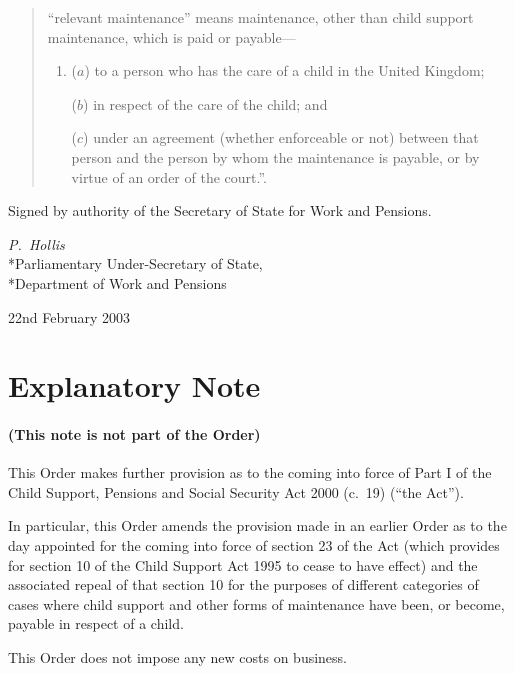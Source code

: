 \documentclass[12pt,a4paper]{article}
\begin{document}
\begin{quotation}
\begin{enumerate}
“relevant maintenance” means maintenance, other than child support maintenance, which is paid or payable—
\begin{enumerate}\item[]
($a$) 
to a person who has the care of a child in the United Kingdom;

($b$) 
in respect of the care of the child; and

($c$) 
under an agreement (whether enforceable or not) between that person and the person by whom the maintenance is payable, or by virtue of an order of the court.”.
\end{enumerate}
\end{enumerate}
\end{quotation}

\bigskip

Signed 
by authority of the Secretary of State for Work and Pensions.

{\raggedleft
\emph{P.~Hollis}\\*Parliamentary Under-Secretary of State,\\*Department of Work and Pensions

}


22nd February 2003

\small

\part{Explanatory Note}

\renewcommand\parthead{— Explanatory Note}

\subsection*{(This note is not part of the Order)}

This Order makes further provision as to the coming into force of Part I of the Child Support, Pensions and Social Security Act 2000 (c.\ 19) (“the Act”).

In particular, this Order amends the provision made in an earlier Order as to the day appointed for the coming into force of section 23 of the Act (which provides for section 10 of the Child Support Act 1995 to cease to have effect) and the associated repeal of that section 10 for the purposes of different categories of cases where child support and other forms of maintenance have been, or become, payable in respect of a child.

This Order does not impose any new costs on business. 
\end{document}
